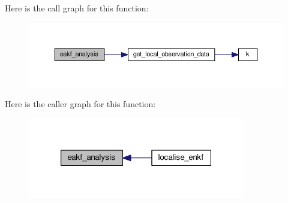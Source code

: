 Here is the call graph for this function\-:\nopagebreak
\begin{figure}[H]
\begin{center}
\leavevmode
\includegraphics[width=350pt]{eakf__analysis_8f90_a7f7aa81cc5a7a2da8f159f216e2bb156_cgraph}
\end{center}
\end{figure}




Here is the caller graph for this function\-:\nopagebreak
\begin{figure}[H]
\begin{center}
\leavevmode
\includegraphics[width=268pt]{eakf__analysis_8f90_a7f7aa81cc5a7a2da8f159f216e2bb156_icgraph}
\end{center}
\end{figure}


